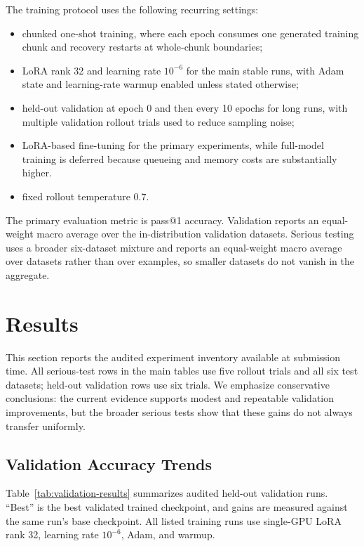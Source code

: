 \documentclass{article}
\begin{document}
The training protocol uses the following recurring settings:
\begin{itemize}
    \item chunked one-shot training, where each epoch consumes one generated training chunk and recovery restarts at whole-chunk boundaries;
    \item LoRA rank 32 and learning rate $10^{-6}$ for the main stable runs, with Adam state and learning-rate warmup enabled unless stated otherwise;
    \item held-out validation at epoch 0 and then every 10 epochs for long runs, with multiple validation rollout trials used to reduce sampling noise;
    \item LoRA-based fine-tuning for the primary experiments, while full-model training is deferred because queueing and memory costs are substantially higher.
    \item fixed rollout temperature $0.7$.
\end{itemize}

The primary evaluation metric is pass@1 accuracy. Validation reports an equal-weight macro average over the in-distribution validation datasets. Serious testing uses a broader six-dataset mixture and reports an equal-weight macro average over datasets rather than over examples, so smaller datasets do not vanish in the aggregate.


\section{Results}
This section reports the audited experiment inventory available at submission time. All serious-test rows in the main tables use five rollout trials and all six test datasets; held-out validation rows use six trials. We emphasize conservative conclusions: the current evidence supports modest and repeatable validation improvements, but the broader serious tests show that these gains do not always transfer uniformly.

\subsection{Validation Accuracy Trends}
Table~\ref{tab:validation-results} summarizes audited held-out validation runs. ``Best'' is the best validated trained checkpoint, and gains are measured against the same run's base checkpoint. All listed training runs use single-GPU LoRA rank 32, learning rate $10^{-6}$, Adam, and warmup.
\end{document}
